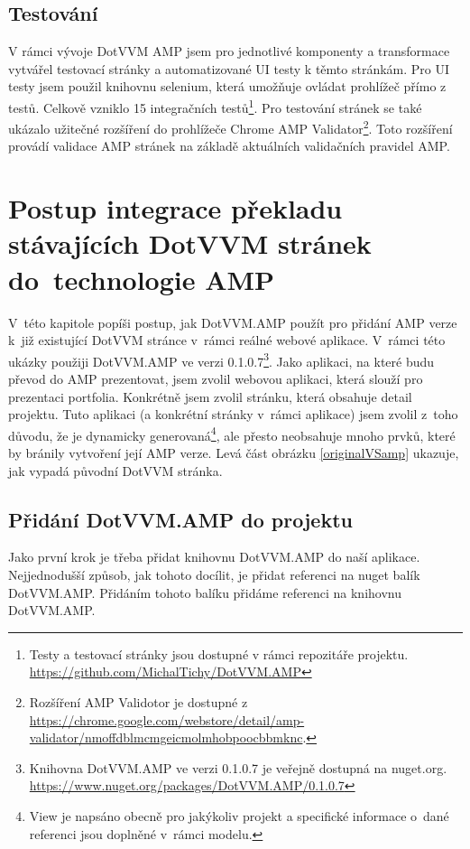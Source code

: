 \section*{Testování}
V rámci vývoje DotVVM AMP jsem pro jednotlivé komponenty a transformace vytvářel testovací stránky a automatizované UI testy k těmto stránkám. Pro UI testy jsem použil knihovnu selenium, která umožňuje ovládat prohlížeč přímo z testů. Celkově vzniklo 15 integračních testů\footnote{Testy a testovací stránky jsou dostupné v rámci repozitáře projektu.\newline
\url{https://github.com/MichalTichy/DotVVM.AMP}}. Pro testování stránek se také ukázalo užitečné rozšíření do prohlížeče Chrome AMP Validator\footnote{Rozšíření AMP Validotor je dostupné z \url{https://chrome.google.com/webstore/detail/amp-validator/nmoffdblmcmgeicmolmhobpoocbbmknc}.}. Toto rozšíření provádí validace AMP stránek na základě aktuálních validačních pravidel AMP.

\chapter{Postup integrace překladu stávajících DotVVM stránek do~technologie AMP}
V~této kapitole popíši postup, jak DotVVM.AMP použít pro přidání AMP verze k~již existující DotVVM stránce v~rámci reálné webové aplikace. V~rámci této ukázky použiji DotVVM.AMP ve verzi 0.1.0.7\footnote{\label{nuget}Knihovna DotVVM.AMP ve verzi 0.1.0.7 je veřejně dostupná na nuget.org.\newline
\url{https://www.nuget.org/packages/DotVVM.AMP/0.1.0.7}}. Jako aplikaci, na které budu převod do AMP prezentovat, jsem zvolil webovou aplikaci, která slouží pro prezentaci portfolia. Konkrétně jsem zvolil stránku, která obsahuje detail projektu. Tuto aplikaci (a konkrétní stránky v~rámci aplikace) jsem zvolil z~toho důvodu, že je dynamicky generovaná\footnote{View je napsáno obecně pro jakýkoliv projekt a specifické informace o~dané referenci jsou doplněné v~rámci modelu. }, ale přesto neobsahuje mnoho prvků, které by bránily vytvoření její AMP verze. Levá část obrázku \ref{originalVSamp} ukazuje, jak vypadá původní DotVVM stránka.

\section{Přidání DotVVM.AMP do projektu}
Jako první krok je třeba přidat knihovnu DotVVM.AMP do naší aplikace. Nejjednodušší způsob, jak tohoto docílit, je přidat referenci na nuget balík DotVVM.AMP. Přidáním tohoto balíku přidáme referenci na knihovnu DotVVM.AMP.
